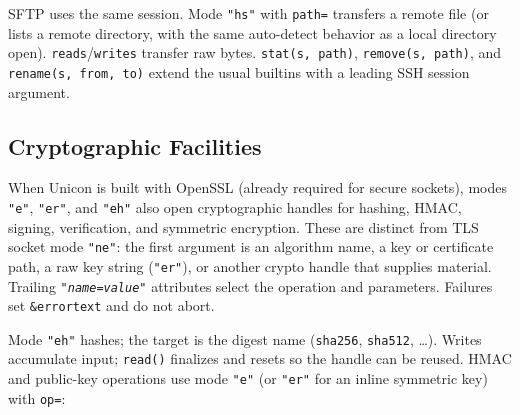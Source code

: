 SFTP uses the same session. Mode \texttt{"hs"} with
\texttt{path=} transfers a remote file (or lists a remote directory,
with the same auto-detect behavior as a local directory open).
\texttt{reads}/\texttt{writes} transfer raw bytes.
\texttt{stat(s, path)}, \texttt{remove(s, path)}, and
\texttt{rename(s, from, to)} extend the usual builtins with a leading
SSH session argument.


\subsection*{Cryptographic Facilities}

When Unicon is built with OpenSSL (already required for secure sockets),
modes \texttt{"e"}, \texttt{"er"}, and \texttt{"eh"} also open
cryptographic handles for hashing, HMAC, signing,
verification, and symmetric encryption. These are distinct from TLS
socket mode \texttt{"ne"}: the first argument is an algorithm name, a
key or certificate path, a raw key string (\texttt{"er"}), or another
crypto handle that supplies material. Trailing
\texttt{"\textit{name}=\textit{value}"} attributes select the operation
and parameters. Failures set \texttt{\&errortext} and do not abort.


Mode \texttt{"eh"} hashes; the target is the digest name
(\texttt{sha256}, \texttt{sha512}, \ldots). Writes accumulate input;
\texttt{read()} finalizes and resets so the handle can be reused.
HMAC and public-key operations use mode \texttt{"e"} (or
\texttt{"er"} for an inline symmetric key) with \texttt{op=}:

